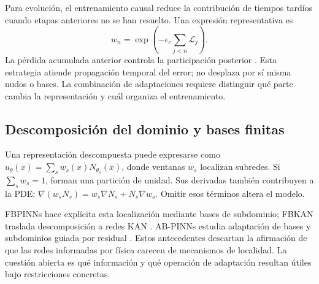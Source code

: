 Para evolución, el entrenamiento causal reduce la contribución de tiempos tardíos cuando etapas anteriores no se han resuelto. Una expresión representativa es
\begin{equation}
w_n=\exp\left(-\epsilon_c\sum_{j<n}\mathcal L_j\right).
\end{equation}
La pérdida acumulada anterior controla la participación posterior \cite{wang2024causal}. Esta estrategia atiende propagación temporal del error; no desplaza por sí misma nudos o bases. La combinación de adaptaciones requiere distinguir qué parte cambia la representación y cuál organiza el entrenamiento.

\subsection{Descomposición del dominio y bases finitas}
Una representación descompuesta puede expresarse como $u_\theta(x)=\sum_s w_s(x)N_{\theta_s}(x)$, donde ventanas $w_s$ localizan subredes. Si $\sum_sw_s=1$, forman una partición de unidad. Sus derivadas también contribuyen a la PDE: $\nabla(w_sN_s)=w_s\nabla N_s+N_s\nabla w_s$. Omitir esos términos altera el modelo.

FBPINNs hace explícita esta localización mediante bases de subdominio; FBKAN traslada descomposición a redes KAN \cite{moseley2023,howard2024}. AB-PINNs estudia adaptación de bases y subdominios guiada por residual \cite{abpinn2025}. Estos antecedentes descartan la afirmación de que las redes informadas por física carecen de mecanismos de localidad. La cuestión abierta es qué información y qué operación de adaptación resultan útiles bajo restricciones concretas.
